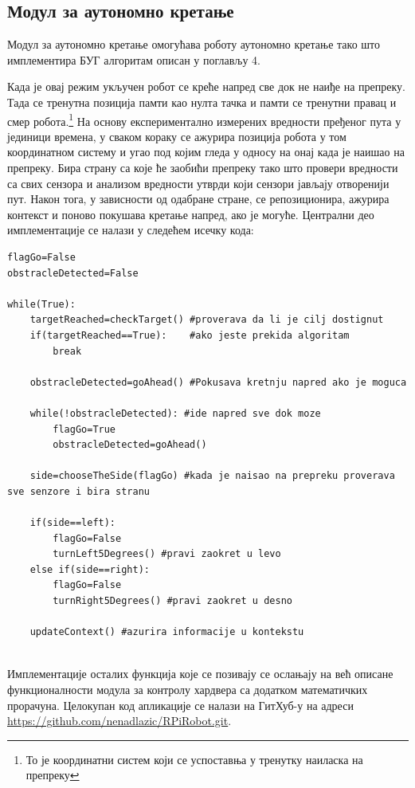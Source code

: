 \documentclass[12pt,oneside]{memoir}
\theoremstyle{remark}
\begin{document}
\subsection{Модул за аутономно кретање}
Модул за аутономно кретање омогућава роботу аутономно кретање тако што имплементира БУГ алгоритам описан у поглављу 4.

Када је овај режим укључен робот се креће напред све док не наиђе на препреку. Тада се тренутна позиција памти као нулта тачка и памти се тренутни правац и смер робота.\footnote{То је координатни систем који се успоставња у тренутку наиласка на препреку} 
На основу експериментално измерених вредности пређеног пута у јединици времена, у сваком кораку се ажурира позиција робота у том координатном систему и угао под којим гледа у односу на онај када је наишао на препреку. Бира страну са које ће заобићи препреку тако што провери вредности са свих сензора и анализом вредности утврди који сензори јављају отворенији пут. Након тога, у зависности од одабране стране, се репозиционира, ажурира контекст и поново покушава кретање напред, ако је могуће. Централни део имплементације се налази у следећем исечку кода:

\begin{lstlisting}
flagGo=False
obstracleDetected=False

while(True):
	targetReached=checkTarget() #proverava da li je cilj dostignut
	if(targetReached==True):	#ako jeste prekida algoritam
		break

	obstracleDetected=goAhead()	#Pokusava kretnju napred ako je moguca

	while(!obstracleDetected): #ide napred sve dok moze
		flagGo=True
		obstracleDetected=goAhead()

	side=chooseTheSide(flagGo) #kada je naisao na prepreku proverava sve senzore i bira stranu

	if(side==left):
		flagGo=False
		turnLeft5Degrees() #pravi zaokret u levo 
	else if(side==right):
		flagGo=False
		turnRight5Degrees() #pravi zaokret u desno
	
	updateContext() #azurira informacije u kontekstu
	
\end{lstlisting}

Имплементације осталих функција које се позивају се ослањају на већ описане функционалности модула за контролу хардвера са додатком математичких прорачуна. Целокупан код апликације се налази на ГитХуб-у на адреси \url{https://github.com/nenadlazic/RPiRobot.git}.
\end{document}
